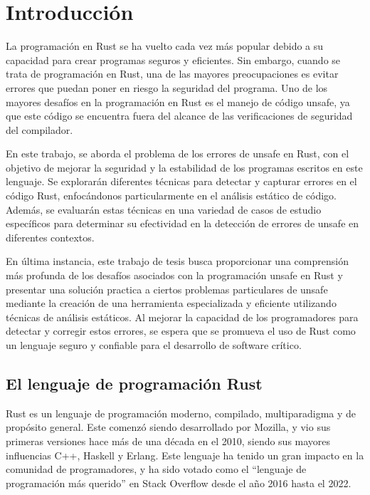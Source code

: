 \chapter{Introducción}

La programación en Rust se ha vuelto cada vez más popular debido a su capacidad para crear programas seguros y eficientes. Sin embargo, cuando se trata de programación en Rust, una de las mayores preocupaciones es evitar errores que puedan poner en riesgo la seguridad del programa. Uno de los mayores desafíos en la programación en Rust es el manejo de código unsafe, ya que este código se encuentra fuera del alcance de las verificaciones de seguridad del compilador.

En este trabajo, se aborda el problema de los errores de unsafe en Rust, con el objetivo de mejorar la seguridad y la estabilidad de los programas escritos en este lenguaje. Se explorarán diferentes técnicas para detectar y capturar errores en el código Rust, enfocándonos particularmente en el análisis estático de código. Además, se evaluarán estas técnicas en una variedad de casos de estudio específicos para determinar su efectividad en la detección de errores de unsafe en diferentes contextos.

En última instancia, este trabajo de tesis busca proporcionar una comprensión más profunda de los desafíos asociados con la programación unsafe en Rust y presentar una solución practica a ciertos problemas particulares de unsafe mediante la creación de una herramienta especializada y eficiente utilizando técnicas de análisis estáticos. Al mejorar la capacidad de los programadores para detectar y corregir estos errores, se espera que se promueva el uso de Rust como un lenguaje seguro y confiable para el desarrollo de software crítico.

\section{El lenguaje de programación Rust}

Rust es un lenguaje de programación moderno, compilado, multiparadigma y de propósito general. Este comenzó siendo desarrollado por Mozilla, y vio sus primeras versiones hace más de una década en el 2010, siendo sus mayores influencias C++, Haskell y Erlang. Este lenguaje ha tenido un gran impacto en la comunidad de programadores, y ha sido votado como el “lenguaje de programación más querido” en Stack Overflow desde el año 2016 hasta el 2022.

